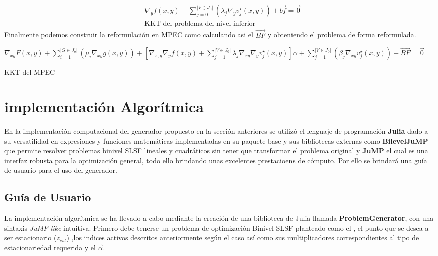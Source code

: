 \begin{equation}
    \begin{aligned}
        &\nabla_{y}f(x,y)+\sum_{j=0}^{|V \in J_0|}(\lambda_j\nabla_{y}v_{j}^{\star}(x,y))+\vec{bf}=\vec{0}\\
        &\text{KKT del problema del nivel inferior}
    \end{aligned}
    \label{KKT_nivel_inferior}
\end{equation}
\linebreak
Finalmente podemos construir la reformulación en MPEC como  calculando asi el $\vec{BF}$ y 
obteniendo el problema de forma reformulada.
\begin{table}[H]
    \begin{equation}
        \label{KKT_del_MPEC}
    \end{equation}
	$\nabla_{xy}F(x,y)+\sum_{i=1}^{|G \in J_o|}(\mu_i\nabla_{xy}g(x,y))+[\nabla_{x,y}\nabla_{y}f(x,y)+\sum_{j=1}^{|V \in J_0|}\lambda_j\nabla_{xy}\nabla_{y}v_{j}^{\star}(x,y)]\alpha+\sum_{j=1}^{|V \in J_0|}(\beta_j\nabla_{xy}v_{j}^{\star}(x,y))+\vec{BF}=\vec{0}$  \label{KKT_del_MPEC}
\caption*{KKT del MPEC}
\end{table}


\section{implementación Algorítmica}

En la implementación computacional del generador propuesto en la sección anteriores
se utilizó el lenguaje de programación \textbf{Julia} \cite{Juliadocs} dado a su versatilidad
en expresiones y funciones matemáticas implementadas en su paquete base y sus bibliotecas externas como 
\textbf{BilevelJuMP} \cite{BilevelJump} que permite resolver problemas binivel SLSF lineales y cuadráticos
sin tener que transformar el problema original y \textbf{JuMP} \cite{JuMPPaper} el cual es una interfaz robusta para la optimización general,
todo ello brindando unas excelentes prestacioens de cómputo. Por ello se brindará una guía de usuario para el uso del generador.

\subsection{Guía de Usuario}
La implementación algorítmica se ha llevado a cabo mediante la creación de una biblioteca de Julia
llamada \textbf{ProblemGenerator}, con una sintaxis \textit{JuMP-like} intuitiva.
Primero debe tenerse un problema de optimización Binivel SLSF planteado como el , el punto que se desea a ser estacionario ($z_{est}$) ,los indices activos descritos anteriormente 
según el caso así como sus multiplicadores correspondientes al tipo de estacionariedad requerida y el $\vec{\alpha}$.

